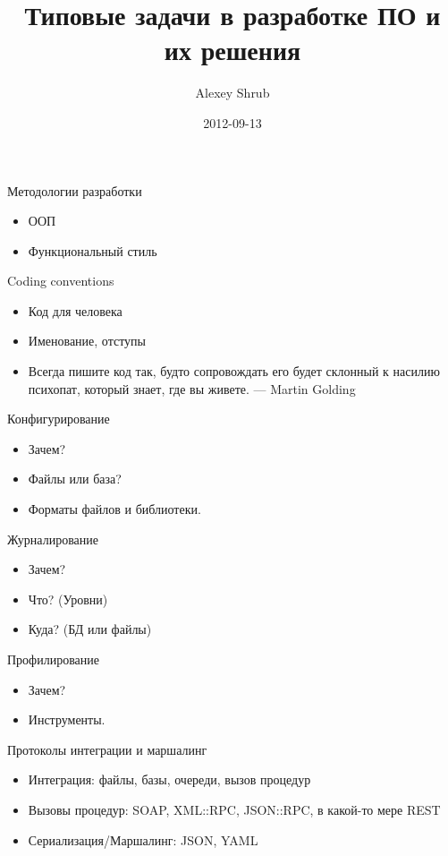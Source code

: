 \documentclass[aspectratio=169]{beamer}
\title{Типовые задачи в разработке ПО и их решения}
\author{Alexey Shrub}
\date{2012-09-13}
\begin{document}
\maketitle

\begin{frame}{Методологии разработки}
\begin{itemize}
\item ООП
\pause
\item Функциональный стиль
\end{itemize}
\end{frame}

\begin{frame}{Coding conventions}
\begin{itemize}
\item Код для человека
\pause
\item Именование, отступы
\pause
\item  Всегда пишите код так, будто сопровождать его будет склонный к насилию психопат, который знает, где вы живете. — Martin Golding
\end{itemize}
\end{frame}

\begin{frame}{Конфигурирование}
\begin{itemize}
\item Зачем?
\pause
\item Файлы или база?
\pause
\item Форматы файлов и библиотеки.
\end{itemize}
\end{frame}

\begin{frame}{Журналирование}
\begin{itemize}
\item Зачем?
\pause
\item Что? (Уровни)
\pause
\item Куда? (БД или файлы)
\end{itemize}
\end{frame}

\begin{frame}{Профилирование}
\begin{itemize}
\item Зачем?
\pause
\item Инструменты.
\end{itemize}
\end{frame}

\begin{frame}{Протоколы интеграции и маршалинг}
\begin{itemize}
\item Интеграция: файлы, базы, очереди, вызов процедур
\pause
\item Вызовы процедур: SOAP, XML::RPC, JSON::RPC, в какой-то мере REST
\pause
\item Сериализация/Маршалинг: JSON, YAML
\end{itemize}
\end{frame}
\end{document}

